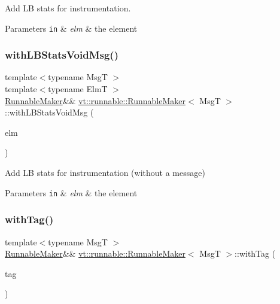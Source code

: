 Add LB stats for instrumentation. 


\begin{DoxyParams}[1]{Parameters}
\mbox{\tt in}  & {\em elm} & the element \\
\hline
\end{DoxyParams}
\mbox{\label{structvt_1_1runnable_1_1_runnable_maker_acce9921f014ab7220f9d7b3ca57e75d5}} 
\subsubsection{\texorpdfstring{with\+L\+B\+Stats\+Void\+Msg()}{withLBStatsVoidMsg()}}
{\footnotesize\ttfamily template$<$typename MsgT $>$ \\
template$<$typename ElmT $>$ \\
\hyperlink{structvt_1_1runnable_1_1_runnable_maker}{Runnable\+Maker}\&\& \hyperlink{structvt_1_1runnable_1_1_runnable_maker}{vt\+::runnable\+::\+Runnable\+Maker}$<$ MsgT $>$\+::with\+L\+B\+Stats\+Void\+Msg (\begin{DoxyParamCaption}\item[{ElmT $\ast$}]{elm }\end{DoxyParamCaption})\hspace{0.3cm}{\ttfamily [inline]}}



Add LB stats for instrumentation (without a message) 


\begin{DoxyParams}[1]{Parameters}
\mbox{\tt in}  & {\em elm} & the element \\
\hline
\end{DoxyParams}
\mbox{\label{structvt_1_1runnable_1_1_runnable_maker_a3a22a3b3952eb54f07e610000f833d7e}} 
\subsubsection{\texorpdfstring{with\+Tag()}{withTag()}}
{\footnotesize\ttfamily template$<$typename MsgT $>$ \\
\hyperlink{structvt_1_1runnable_1_1_runnable_maker}{Runnable\+Maker}\&\& \hyperlink{structvt_1_1runnable_1_1_runnable_maker}{vt\+::runnable\+::\+Runnable\+Maker}$<$ MsgT $>$\+::with\+Tag (\begin{DoxyParamCaption}\item[{\hyperlink{namespacevt_a84ab281dae04a52a4b243d6bf62d0e52}{Tag\+Type}}]{tag }\end{DoxyParamCaption})\hspace{0.3cm}{\ttfamily [inline]}}



